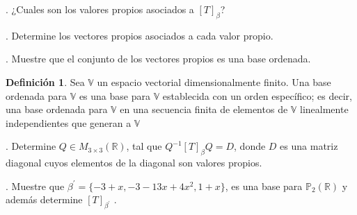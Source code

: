 \documentclass[letterpaper]{article}
\newcommand{\V}{\mathds{V}}
\renewcommand{\*}{\cdot}
\theoremstyle{definition}
\newtheorem{definition}{Definición}
\begin{document}
. ¿Cuales son los valores propios asociados a $[T]_{\beta}$?

. Determine los vectores propios asociados a cada valor propio. 

. Muestre que el conjunto de los vectores propios es una base ordenada.
\begin{definition}
	Sea $ \V $ un espacio vectorial dimensionalmente finito. Una base ordenada para $ \V $ es una base para $ \V $ establecida con un orden específico; es decir, una base ordenada para $ \V $ en una secuencia finita de elementos de $ \V $ linealmente independientes que generan a $ \V $
\end{definition}
. Determine $Q \in M_{3\times 3}(\mathbb{R})$, tal que $Q^{-1}[T]_{\beta} Q = D$, donde $D$ es una matriz diagonal cuyos elementos de la diagonal son valores propios.

. Muestre que $\beta^{'} =\{ -3+x , -3-13x + 4x^2, 1+x \}$, es una base para $ \mathbb{P}_{2}(\mathbb{R})$ y además determine $[T]_{\beta^{'}}$ .
\end{document}
